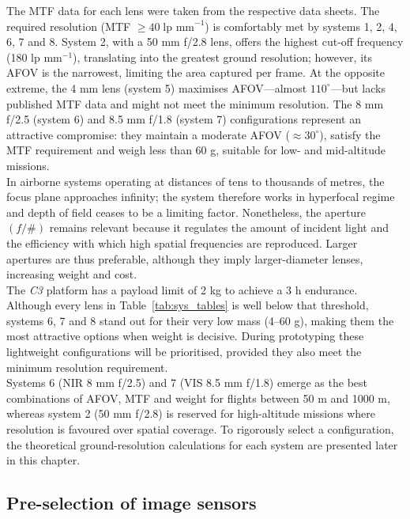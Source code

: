 \noindent The MTF data for each lens were taken from the respective data
sheets.  The required resolution (MTF $\ge 40\;\text{lp mm}^{-1}$) is
comfortably met by systems 1, 2, 4, 6, 7 and 8.  System 2, with a 50 mm
f/2.8 lens, offers the highest cut-off frequency
(180 lp mm$^{-1}$), translating into the greatest ground
resolution; however, its AFOV is the narrowest, limiting the area
captured per frame.  At the opposite extreme, the 4 mm lens (system 5)
maximises AFOV—almost \(110^{\circ}\)—but lacks published MTF data and
might not meet the minimum resolution.  The 8 mm f/2.5 (system 6) and
8.5 mm f/1.8 (system 7) configurations represent an attractive
compromise: they maintain a moderate AFOV ($\approx 30^{\circ}$), satisfy
the MTF requirement and weigh less than 60 g, suitable for low- and
mid-altitude missions.\\

\noindent In airborne systems operating at distances of tens to thousands of
metres, the focus plane approaches infinity; the system therefore works
in hyperfocal regime and depth of field ceases to be a limiting factor.
Nonetheless, the aperture \((f/\#)\) remains relevant because it
regulates the amount of incident light and the efficiency with which
high spatial frequencies are reproduced. Larger apertures are thus
preferable, although they imply larger-diameter lenses, increasing
weight and cost.\\

\noindent The \textit{C3} platform has a payload limit of 2 kg to achieve a 3 h
endurance. Although every lens in Table~\ref{tab:sys_tables} is well
below that threshold, systems 6, 7 and 8 stand out for their very low
mass (4–60 g), making them the most attractive options when weight is
decisive. During prototyping these lightweight configurations will be
prioritised, provided they also meet the minimum resolution
requirement.\\

\noindent Systems 6 (NIR 8 mm f/2.5) and 7 (VIS 8.5 mm f/1.8) emerge as the best
combinations of AFOV, MTF and weight for flights between 50 m and
1000 m, whereas system 2 (50 mm f/2.8) is reserved for high-altitude
missions where resolution is favoured over spatial coverage. To rigorously
select a configuration, the theoretical ground-resolution calculations
for each system are presented later in this chapter.\\ 

\subsection{Pre-selection of image sensors}
\label{sec:sensor_selection}


